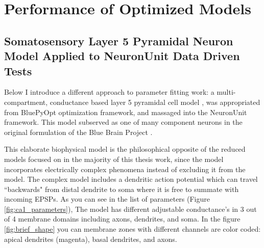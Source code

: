 



%


\section{Performance of Optimized Models}


\subsection{Somatosensory Layer 5 Pyramidal Neuron Model Applied to NeuronUnit Data Driven Tests}

Below I introduce a different approach to parameter fitting work: a multi-compartment, conductance based layer 5 pyramidal cell model \citep{van2016bluepyopt}, was appropriated from BluePyOpt optimization framework, and massaged into the NeuronUnit framework.
This model subserved as one of many component neurons in the original formulation of the Blue Brain Project \cite{markram2015reconstruction}.


This elaborate biophysical model is the philosophical opposite of the reduced models focused on in the majority of this thesis work, since the model incorporates electrically complex phenomena instead of excluding it from the model.
The complex model includes a dendritic action potential which can travel ``backwards" from distal dendrite to soma where it is free to summate with incoming EPSPs.
As you can see in the list of parameters (Figure \ref{fig:ca1_parameters}), The model has different adjustable conductance's in 3 out of 4 membrane domains including axons, dendrites, and soma. In the figure \ref{fig:brief_shape} you can membrane zones with different channels are color coded: apical dendrites (magenta), basal dendrites, and axons.


